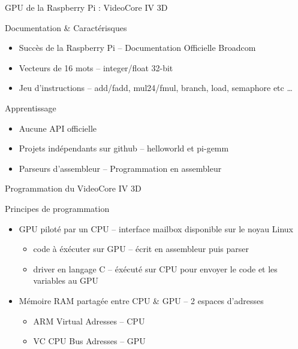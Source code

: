 \documentclass{bredelebeamer}
\begin{document}
\begin{frame}{GPU de la Raspberry Pi : VideoCore IV 3D}

\begin{block}{Documentation \& Caractérisques}
\begin{itemize}
\item Succès de la Raspberry Pi -- Documentation Officielle Broadcom
\item Vecteurs de 16 mots -- integer/float 32-bit
\item Jeu d'instructions -- add/fadd, mul24/fmul, branch, load, semaphore etc \ldots
\end{itemize}
\end{block}

\begin{block}{Apprentissage}
\begin{itemize}
\item Aucune API officielle
\item Projets indépendants sur github -- helloworld et pi-gemm
\item Parseurs d'assembleur -- Programmation en assembleur
\end{itemize}
\end{block}

\end{frame}


\begin{frame}{Programmation du VideoCore IV 3D}

\begin{alertblock}{Principes de programmation}
\begin{itemize}
\item GPU piloté par un CPU -- interface mailbox disponible sur le noyau Linux
	\begin{itemize}
		\item code à éxécuter sur GPU -- écrit en assembleur puis parser
		\item driver en langage C -- éxécuté sur CPU pour envoyer le code et les variables au GPU
	\end{itemize}
\item Mémoire RAM partagée entre CPU \& GPU -- 2 espaces d'adresses
	\begin{itemize}
		\item ARM Virtual Adresses -- CPU
		\item VC CPU Bus Adresses -- GPU
	\end{itemize}
\end{itemize}
\end{alertblock}

\end{frame}
\end{document}
